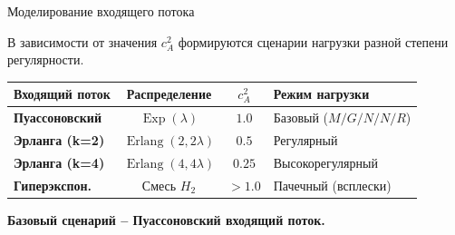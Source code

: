 \documentclass[aspectratio=169,12pt]{beamer}
\newcommand{\slideconclusion}[1]{
  \vspace{0.25cm}
  {\large\bfseries #1}
}
\begin{document}
\begin{frame}{Моделирование входящего потока}

В зависимости от значения $c_A^2$ формируются сценарии нагрузки разной степени регулярности.

\vspace{0.2cm}
\begin{center}
\small
\renewcommand{\arraystretch}{1.3}
\begin{tabular}{l|c|c|l}
  \textbf{Входящий поток} & \textbf{Распределение} & $c_A^2$ & \textbf{Режим нагрузки} \\ \hline
  \color{rudnblue}\textbf{Пуассоновский} & $\operatorname{Exp}(\lambda)$ & $1.0$ & Базовый ($M/G/N/N/R$) \\
  \textbf{Эрланга (k=2)} & $\operatorname{Erlang}(2, 2\lambda)$ & $0.5$ & Регулярный \\
  \textbf{Эрланга (k=4)} & $\operatorname{Erlang}(4, 4\lambda)$ & $0.25$ & Высокорегулярный \\
  \textbf{Гиперэкспон.} & Смесь $H_2$ & $> 1.0$ & Пачечный (всплески) \\
\end{tabular}
\end{center}

\vspace{0.3cm}
\flushleft
\slideconclusion{Базовый сценарий -- Пуассоновский входящий поток.}

\end{frame}
\end{document}
